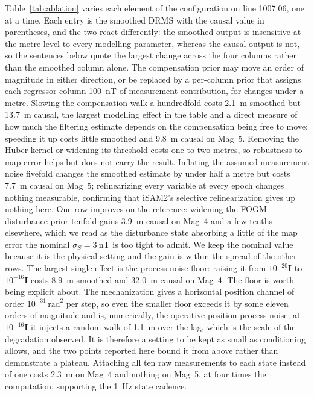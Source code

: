 \documentclass{IEEEtaes}
\begin{document}
Table~\ref{tab:ablation} varies each element of the configuration on line
1007.06, one at a time. Each entry is the smoothed DRMS with the causal value
in parentheses, and the two react differently: the smoothed output is
insensitive at the metre level to every modelling parameter, whereas the
causal output is not, so the sentences below quote the largest change across
the four columns rather than the smoothed column alone. The compensation prior may
move an order of magnitude in either
direction, or be replaced by a per-column prior that assigns each regressor
column \SI{100}{\nano\tesla} of measurement contribution, for changes under a
metre. Slowing the compensation walk a hundredfold costs \SI{2.1}{\meter}
smoothed but \SI{13.7}{\meter} causal, the largest modelling effect in the
table and a direct measure of how much the filtering estimate depends on the
compensation being free to move; speeding it up costs little smoothed and
\SI{9.8}{\meter} causal on Mag~5. Removing the Huber kernel or widening its threshold costs one to
two metres, so robustness to map error helps but does not carry the result.
Inflating the assumed measurement noise fivefold changes the smoothed
estimate by under half a metre but costs \SI{7.7}{\meter} causal on Mag~5;
relinearizing every variable at every epoch changes nothing measurable,
confirming that iSAM2's selective relinearization gives up nothing here.
One row improves on the reference: widening the FOGM disturbance prior
tenfold gains \SI{3.9}{\meter} causal on Mag~4 and a few tenths elsewhere,
which we read as the disturbance state absorbing a little of the map error
the nominal $\sigma_S=\SI{3}{\nano\tesla}$ is too tight to admit. We keep
the nominal value because it is the physical setting and the gain is within
the spread of the other rows.
The largest single effect is the process-noise floor: raising it from
$10^{-20}\mathbf{I}$ to $10^{-16}\mathbf{I}$ costs \SI{8.9}{\meter} smoothed
and \SI{32.0}{\meter} causal on Mag~4. The floor is worth being explicit
about. The mechanization gives a horizontal position channel of order
$10^{-31}\,\mathrm{rad}^2$ per step, so even the smaller floor exceeds it by
some eleven orders of magnitude and is, numerically, the operative position
process noise; at $10^{-16}\mathbf{I}$ it injects a random walk of
\SI{1.1}{\meter} over the lag, which is the scale of the degradation
observed. It is therefore a setting to be kept as small as conditioning
allows, and the two points reported here bound it from above rather than
demonstrate a plateau. Attaching all ten raw
measurements to each state instead of one costs \SI{2.3}{\meter} on Mag~4 and
nothing on Mag~5, at four times the computation, supporting the
\SI{1}{\hertz} state cadence.
\end{document}
